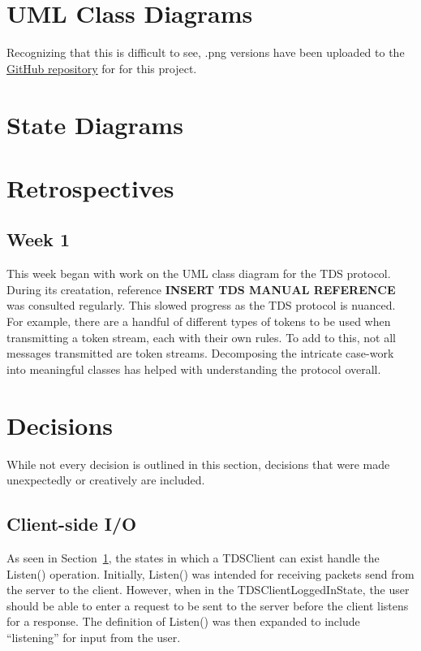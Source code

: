 \documentclass{article}
\begin{document}
\section{UML Class Diagrams}\label{sec:uml}
    Recognizing that this is difficult to see, .png versions have been uploaded to the \href{https://github.com/SawyersCoding/bookdex/tree/main}{GitHub repository} for for this project.

\section{State Diagrams}\label{sec:state}

\section{Retrospectives}\label{sec:retro}
    \subsection{Week 1}\label{sec:retro:week1}
        This week began with work on the UML class diagram for the TDS protocol. During its creatation, reference \textbf{INSERT TDS MANUAL REFERENCE} was consulted regularly. This slowed progress as the TDS protocol is nuanced. For example, there are a handful of different types of tokens to be used when transmitting a token stream, each with their own rules. To add to this, not all messages transmitted are token streams. Decomposing the intricate case-work into meaningful classes has helped with understanding the protocol overall.

\section{Decisions}\label{sec:dec}
    While not every decision is outlined in this section, decisions that were made unexpectedly or creatively are included.

    \subsection{Client-side I/O}\label{sec:dec:clientio}
        As seen in Section~\ref{sec:uml}, the states in which a TDSClient can exist handle the Listen() operation. Initially, Listen() was intended for receiving packets send from the server to the client. However, when in the TDSClientLoggedInState, the user should be able to enter a request to be sent to the server before the client listens for a response. The definition of Listen() was then expanded to include ``listening'' for input from the user.
\end{document}
